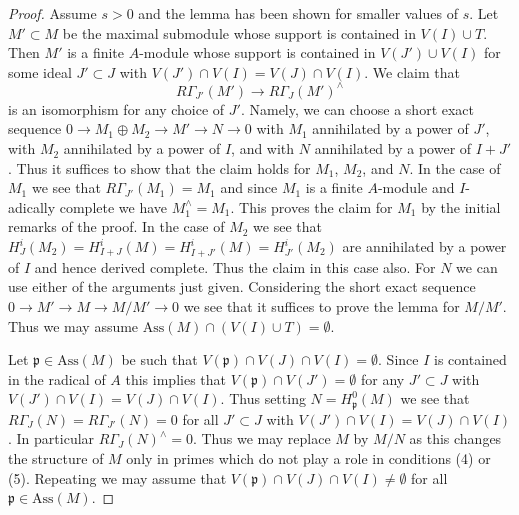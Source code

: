\begin{proof}
\medskip\noindent
Assume $s > 0$ and the lemma has been shown for smaller values of $s$.
Let $M' \subset M$ be the maximal submodule whose support is contained
in $V(I) \cup T$. Then $M'$ is a finite $A$-module whose support
is contained in $V(J') \cup V(I)$ for some ideal $J' \subset J$
with $V(J') \cap V(I) = V(J) \cap V(I)$.
We claim that
$$
R\Gamma_{J'}(M') \to R\Gamma_J(M')^\wedge
$$
is an isomorphism for any choice of $J'$.
Namely, we can choose a short exact sequence
$0 \to M_1 \oplus M_2 \to M' \to N \to 0$ with
$M_1$ annihilated by a power of $J'$, with $M_2$ annihilated
by a power of $I$, and with $N$ annihilated by a power of $I + J'$.
Thus it suffices to show that the claim holds for $M_1$, $M_2$, and $N$.
In the case of $M_1$ we see that $R\Gamma_{J'}(M_1) = M_1$ and
since $M_1$ is a finite $A$-module and $I$-adically complete
we have $M_1^\wedge = M_1$. This proves the claim for $M_1$
by the initial remarks of the proof. In the case of $M_2$ we see that
$H^i_J(M_2) = H^i_{I + J}(M) = H^i_{I + J'}(M) = H^i_{J'}(M_2)$
are annihilated by a power of $I$ and hence derived complete.
Thus the claim in this case also. For $N$ we can use either of
the arguments just given. Considering the short exact sequence
$0 \to M' \to M \to M/M' \to 0$
we see that it suffices to prove the lemma for $M/M'$.
Thus we may assume $\text{Ass}(M) \cap (V(I) \cup T) = \emptyset$.

\medskip\noindent
Let $\mathfrak p \in \text{Ass}(M)$ be such that
$V(\mathfrak p) \cap V(J) \cap V(I) = \emptyset$.
Since $I$ is contained in the radical of $A$ this implies
that $V(\mathfrak p) \cap V(J') = \emptyset$ for any
$J' \subset J$ with $V(J') \cap V(I) = V(J) \cap V(I)$.
Thus setting $N = H^0_\mathfrak p(M)$ we see that
$R\Gamma_J(N) = R\Gamma_{J'}(N) = 0$ for all
$J' \subset J$ with $V(J') \cap V(I) = V(J) \cap V(I)$.
In particular $R\Gamma_J(N)^\wedge = 0$.
Thus we may replace $M$ by $M/N$ as this changes the
structure of $M$ only in primes which do not play
a role in conditions (4) or (5). Repeating we may assume that
$V(\mathfrak p) \cap V(J) \cap V(I) \not = \emptyset$
for all $\mathfrak p \in \text{Ass}(M)$.


\end{proof}
